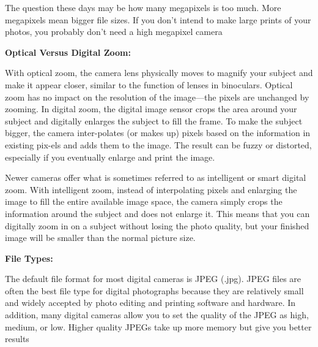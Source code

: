 \documentclass{report}
\begin{document}
    \bigbreak \noindent 
    The question these days may be how many megapixels is too much. More megapixels mean bigger file sizes. If you don’t intend to make large prints of your photos, you probably don’t need a high megapixel camera

    \bigbreak \noindent \bigbreak \noindent 
    \begin{Large}
        \textbf{Optical Versus Digital Zoom:}
    \end{Large}

    \bigbreak \noindent 
    With optical zoom, the camera lens physically moves to magnify your subject and make it appear closer, similar to the function of lenses in binoculars. Optical zoom has no impact on the resolution of the image—the pixels are unchanged by zooming. In digital zoom, the digital image sensor crops the area around your subject and digitally enlarges the subject to fill the frame. To make the subject bigger, the camera inter-polates (or makes up) pixels based on the information in existing pix-els and adds them to the image. The result can be fuzzy or distorted, especially if you eventually enlarge and print the image.

    \bigbreak \noindent 
    Newer cameras offer what is sometimes referred to as intelligent or smart digital zoom. With intelligent zoom, instead of interpolating pixels and enlarging the image to fill the entire available image space, the camera simply crops the information around the subject and does not enlarge it. This means that you can digitally zoom in on a subject without losing the photo quality, but your finished image will be smaller than the normal picture size.

    \bigbreak \noindent 

    \bigbreak \noindent \bigbreak \noindent 
    \begin{Large}
        \textbf{File Types:}
    \end{Large}

    \bigbreak \noindent 
    The default file format for most digital cameras is JPEG (.jpg). JPEG files are often the best file type for digital photographs because they are relatively small and widely accepted by photo editing and printing software and hardware. In addition, many digital cameras allow you to set the quality of the JPEG as high, medium, or low. Higher quality JPEGs take up more memory but give you better results
\end{document}
